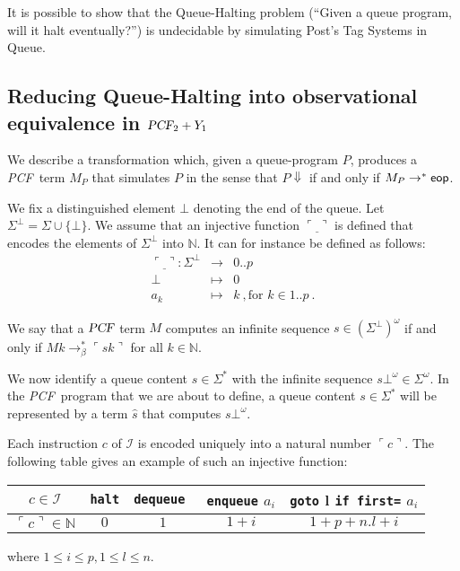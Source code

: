 \documentclass{article}
\newcommand{\encode}[1]{\ulcorner #1 \urcorner}
\newcommand{\nat}{\mathbb{N}}
\newcommand\eop{{\sf eop}}
\newcommand{\betared}{\rightarrow_\beta}
\newcommand\pcf{\textsl{PCF}}
\begin{document}
It is possible to show that the Queue-Halting problem (``Given a queue program, will it halt eventually?'') is undecidable by simulating Post's Tag Systems in Queue.

\subsection{Reducing Queue-Halting into observational equivalence in $\pcf_2 + Y_1$}

We describe a transformation which, given a queue-program $P$, produces a \pcf\ term $M_P$ that simulates $P$ in the sense that $P \Downarrow$ if and only if $M_P \rightarrow^* \eop$.

We fix a distinguished element $\bot$ denoting the end of the queue. Let $\Sigma^\bot = \Sigma \cup \{ \bot \}$. We assume that an injective function $\encode{\underline{\ }}$ is defined that encodes  the
elements of $\Sigma^\bot$ into $\nat$. It can for instance be defined as follows:
\begin{eqnarray*}
\encode{\underline{\ }} : \Sigma^\bot &\longrightarrow& 0..p \\
 \bot &\mapsto& 0 \\
 a_k &\mapsto& k \ , \mbox{for } k \in 1..p \ .
\end{eqnarray*}

We say that a $\pcf$ term $M$ computes an infinite sequence $s \in {(\Sigma^\bot)}^\omega$ if and only if
$M k \betared^* \encode{s k}$ for all $k\in \nat$.

We now identify a queue content $s \in \Sigma^*$ with the infinite sequence $s \bot^\omega \in \Sigma^\omega$. In the \pcf\ program that we are about to define, a queue content $s \in \Sigma^*$ will be represented by a term $\hat{s}$ that computes $s \bot^\omega$.

Each instruction $c$ of $\mathcal{I}$ is encoded uniquely into a natural number $\encode{ c }$. The following table gives an example of such an injective function:
\begin{center}
\begin{tabular}{c|c|c|c|c}
$c \in \mathcal{I}$ & {\tt halt} & {\tt dequeue } & {\tt enqueue} $a_i$ &  {\tt goto} l {\tt if first=} $a_i$ \\ \hline
$\encode{ c } \in \nat$ & $0$ & $1$ & $1+i$ & $1+p + n.l +i$ \\
\end{tabular}
\end{center}
where $1 \leq i \leq p, 1 \leq l \leq n$.
\end{document}
